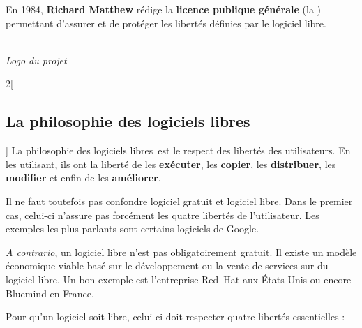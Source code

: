 \newcommand{\lls}{logiciels libres~}


\begin{minipage}{0.7\textwidth}
\begin{center}
En 1984, \textbf{Richard Matthew } rédige la \textbf{licence publique générale } (la ) permettant d’assurer et de protéger les libertés définies par le logiciel libre. 
\end{center}
\end{minipage}
\begin{minipage}{0.3\textwidth}
\begin{center}
\\
\textit{Logo du projet }
\end{center}
\end{minipage}

\begin{multicols}{2}[\subsection{La philosophie des logiciels libres}]
La philosophie des \lls est le respect des libertés des utilisateurs. En les utilisant, ils ont la liberté de les \textbf{exécuter}, les \textbf{copier}, les \textbf{distribuer}, les \textbf{modifier} et enfin de les \textbf{améliorer}.

Il ne faut toutefois pas confondre logiciel gratuit et logiciel libre. Dans le premier cas, celui-ci n’assure pas forcément les quatre libertés de l’utilisateur. Les exemples les plus parlants sont certains logiciels de Google.

\textit{A contrario}, un  logiciel libre n’est pas obligatoirement gratuit. Il existe un modèle économique viable basé sur le développement ou la vente de services sur du logiciel libre. Un bon exemple est l’entreprise Red~Hat aux États-Unis ou encore Bluemind en France.
\end{multicols}


Pour qu’un logiciel soit libre, celui-ci doit respecter quatre libertés essentielles :

